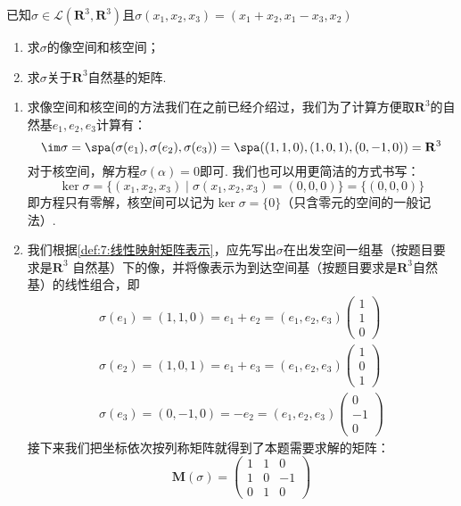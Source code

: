 \begin{example}\label{ex:7:矩阵表示1}
    已知$\sigma \in \mathcal{L}(\mathbf{R}^3,\mathbf{R}^3)$且$\sigma(x_1,x_2,x_3)=(x_1+x_2,x_1-x_3, x_2)$
    \begin{enumerate}[label=(\arabic*)]
        \item 求$\sigma$的像空间和核空间；

        \item 求$\sigma$关于$\mathbf{R}^3$自然基的矩阵.
    \end{enumerate}
\end{example}
\begin{solution}
    \begin{enumerate}[label=(\arabic*)]
        \item 求像空间和核空间的方法我们在之前已经介绍过，我们为了计算方便取$\mathbf{R}^3$的自然基$e_1,e_2,e_3$计算有：
        \[\im\sigma=\spa(\sigma(e_1),\sigma(e_2),\sigma(e_3))=\spa((1,1,0),(1,0,1),(0,-1,0))=\mathbf{R}^3\]
        对于核空间，解方程$\sigma(\alpha)=0$即可. 我们也可以用更简洁的方式书写：
        \[\ker\sigma=\{(x_1,x_2,x_3)\mid \sigma(x_1,x_2,x_3)=(0,0,0)\}=\{(0,0,0)\}\]
        即方程只有零解，核空间可以记为$\ker\sigma=\{0\}$（只含零元的空间的一般记法）.
        \item 我们根据\autoref{def:7:线性映射矩阵表示}，应先写出$\sigma$在出发空间一组基（按题目要求是$\mathbf{R}^3$
        自然基）下的像，并将像表示为到达空间基（按题目要求是$\mathbf{R}^3$自然基）的线性组合，即
        \begin{gather*}
            \sigma(e_1)=(1,1,0)=e_1+e_2=(e_1,e_2,e_3)\begin{pmatrix}
                1 \\ 1 \\ 0
            \end{pmatrix} \\
            \sigma(e_2)=(1,0,1)=e_1+e_3=(e_1,e_2,e_3)\begin{pmatrix}
                1 \\ 0 \\ 1
            \end{pmatrix} \\
            \sigma(e_3)=(0,-1,0)=-e_2=(e_1,e_2,e_3)\begin{pmatrix}
                0 \\ -1 \\ 0
            \end{pmatrix}
        \end{gather*}
        接下来我们把坐标依次按列称矩阵就得到了本题需要求解的矩阵：
        \[\mathbf{M}(\sigma)=\begin{pmatrix}
            1 & 1 & 0 \\
            1 & 0 & -1 \\
            0 & 1 & 0
        \end{pmatrix}\]
    \end{enumerate}
\end{solution}

